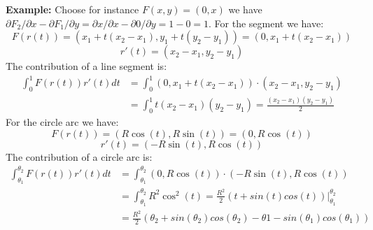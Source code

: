 \textbf{Example:} Choose for instance $F(x, y) = (0, x)$ we have $\partial F_2 \slash \partial x - \partial F_1 \slash \partial y = 
\partial x \slash \partial x - \partial 0 \slash \partial y = 1 - 0 = 1$. For the segment we have:
$$
F(r(t)) = (x_1 + t(x_2 - x_1), y_1 + t(y_2 - y_1)) = (0, x_1 + t(x_2 - x_1))
$$
$$
r'(t) = (x_2 - x_1, y_2 - y_1)
$$
The contribution of a line segment is:
\footnotesize
\begin{align*}
\int_0^1 F(r(t)) r'(t) dt & = \int_0^1 (0, x_1 + t(x_2 - x_1)) \cdot (x_2 - x_1, y_2 - y_1) \\
& = \int_0^1 t (x_2 - x_1) (y_2 - y_1) = \frac{(x_2 - x_1) (y_2 - y_1)}{2}
\end{align*}
\normalsize
For the circle arc we have:
$$
F(r(t)) = (R \cos(t), R \sin(t)) = (0, R \cos(t))
$$
$$
r'(t) = (-R \sin(t), R \cos(t))
$$
The contribution of a circle arc is:
\footnotesize
\begin{align*}
\int_{\theta_1}^{\theta_2} F(r(t)) r'(t) dt & = \int_{\theta_1}^{\theta_2} (0, R \cos(t)) \cdot (-R \sin(t), R \cos(t)) \\
& = \int_{\theta_1}^{\theta_2} R^2 \cos^2(t) = \frac{R^2}{2} \left( t + sin(t) cos(t) \right) \Big|_{\theta_1}^{\theta_2}  \\
& = \frac{R^2}{2} \left( \theta_2 + sin(\theta_2) cos(\theta_2) - \theta1 - sin(\theta_1) cos(\theta_1) \right)
\end{align*}
\begin{center}
\end{center}

